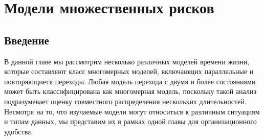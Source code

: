 
\chapter{Модели множественных рисков}

%
%
%
%


\section{Введение}\label{sec:19.1}

\noindent
В данной главе мы рассмотрим несколько различных моделей времени жизни, которые составляют класс многомерных моделей, включающих параллельные и повторяющиеся переходы. Любая модель перехода с двумя и более состояниями может быть классифицирована как многомерная модель, поскольку такой анализ подразумевает оценку совместного распределения нескольких длительностей. Несмотря на то, что изучаемые модели могут относиться к различным ситуациям и типам данных, мы представим их в рамках одной главы для организационного удобства.

